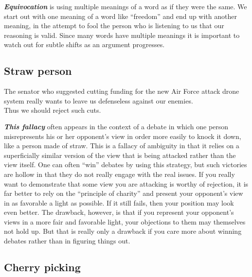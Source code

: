 \documentclass[12pt, openany]{book}
\begin{document}
\textbf{\emph{Equivocation}} is using multiple meanings of a word as if they were the same. We start out with one meaning of a word like ``freedom'' and end up with another meaning, in the attempt to fool the person who is listening to us that our reasoning is valid. Since many words have multiple meanings it is important to watch out for subtle shifts as an argument progresses.

\hypertarget{straw-person}{%
\subsection*{Straw person}\label{straw-person}}


\begin{center}

\begin{argument}

The senator who suggested cutting funding for the new Air Force attack drone system really wants to leave us defenseless against our enemies.\\

Thus we should reject such cuts.

\end{argument}

\end{center}

\textbf{\emph{This fallacy}} often appears in the context of a debate in which one person misrepresents his or her opponent's view in order more easily to knock it down, like a person made of straw. This is a fallacy of ambiguity in that it relies on a superficially similar version of the view that is being attacked rather than the view itself. One can often ``win'' debates by using this strategy, but such victories are hollow in that they do not really engage with the real issues. If you really want to demonstrate that some view you are attacking is worthy of rejection, it is far better to rely on the ``principle of charity'' and present your opponent's view in as favorable a light as possible. If it still fails, then your position may look even better. The drawback, however, is that if you represent your opponent's views in a more fair and favorable light, your objections to them may themselves not hold up. But that is really only a drawback if you care more about winning debates rather than in figuring things out.

\hypertarget{cherry-picking}{%
\subsection*{Cherry picking}\label{cherry-picking}}
\end{document}
